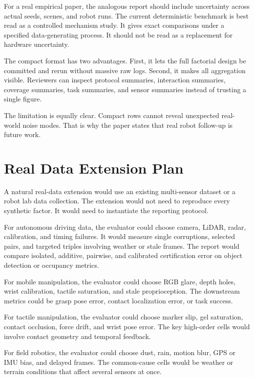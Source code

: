 \documentclass{article}
\begin{document}
For a real empirical paper, the analogous report should include uncertainty across actual seeds, scenes, and robot runs. The current deterministic benchmark is best read as a controlled mechanism study. It gives exact comparisons under a specified data-generating process. It should not be read as a replacement for hardware uncertainty.

The compact format has two advantages. First, it lets the full factorial design be committed and rerun without massive raw logs. Second, it makes all aggregation visible. Reviewers can inspect protocol summaries, interaction summaries, coverage summaries, task summaries, and sensor summaries instead of trusting a single figure.

The limitation is equally clear. Compact rows cannot reveal unexpected real-world noise modes. That is why the paper states that real robot follow-up is future work.

\section{Real Data Extension Plan}

A natural real-data extension would use an existing multi-sensor dataset or a robot lab data collection. The extension would not need to reproduce every synthetic factor. It would need to instantiate the reporting protocol.

For autonomous driving data, the evaluator could choose camera, LiDAR, radar, calibration, and timing failures. It would measure single corruptions, selected pairs, and targeted triples involving weather or stale frames. The report would compare isolated, additive, pairwise, and calibrated certification error on object detection or occupancy metrics.

For mobile manipulation, the evaluator could choose RGB glare, depth holes, wrist calibration, tactile saturation, and stale proprioception. The downstream metrics could be grasp pose error, contact localization error, or task success.

For tactile manipulation, the evaluator could choose marker slip, gel saturation, contact occlusion, force drift, and wrist pose error. The key high-order cells would involve contact geometry and temporal feedback.

For field robotics, the evaluator could choose dust, rain, motion blur, GPS or IMU bias, and delayed frames. The common-cause cells would be weather or terrain conditions that affect several sensors at once.
\end{document}
